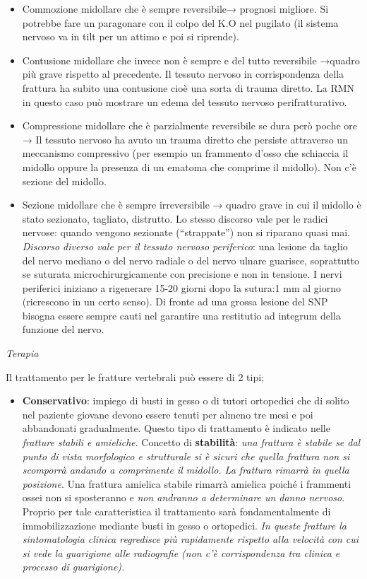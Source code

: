 \documentclass[]{article}
\begin{document}
\begin{itemize}
\item
  Commozione midollare che è sempre reversibile→ prognosi migliore. Si
  potrebbe fare un paragonare con il colpo del K.O nel pugilato (il
  sistema nervoso va in tilt per un attimo e poi si riprende).
\item
  Contusione midollare che invece non è sempre e del tutto reversibile
  →quadro più grave rispetto al precedente. Il tessuto nervoso in
  corrispondenza della frattura ha subito una contusione cioè una sorta
  di trauma diretto. La RMN in questo caso può mostrare un edema del
  tessuto nervoso perifratturativo.
\item
  Compressione midollare che è parzialmente reversibile se dura però
  poche ore → Il tessuto nervoso ha avuto un trauma diretto che persiste
  attraverso un meccanismo compressivo (per esempio un frammento d'osso
  che schiaccia il midollo oppure la presenza di un ematoma che comprime
  il midollo). Non c'è sezione del midollo.
\item
  Sezione midollare che è sempre irreversibile → quadro grave in cui il
  midollo è stato sezionato, tagliato, distrutto. Lo stesso discorso
  vale per le radici nervose: quando vengono sezionate (``strappate'')
  non si riparano quasi mai. \emph{Discorso diverso vale per il tessuto
  nervoso periferico}: una lesione da taglio del nervo mediano o del
  nervo radiale o del nervo ulnare guarisce, soprattutto se suturata
  microchirurgicamente con precisione e non in tensione. I nervi
  periferici iniziano a rigenerare 15-20 giorni dopo la sutura:1 mm al
  giorno (ricrescono in un certo senso). Di fronte ad una grossa lesione
  del SNP bisogna essere sempre cauti nel garantire una restitutio ad
  integrum della funzione del nervo.
\end{itemize}

\emph{Terapia}

Il trattamento per le fratture vertebrali può essere di 2 tipi;

\begin{itemize}
\item
  \textbf{Conservativo}: impiego di busti in gesso o di tutori
  ortopedici che di solito nel paziente giovane devono essere tenuti per
  almeno tre mesi e poi abbandonati gradualmente. Questo tipo di
  trattamento è indicato nelle \emph{fratture stabili e amieliche}.
  Concetto di \textbf{stabilità}: \emph{una frattura è stabile se dal
  punto di vista morfologico e strutturale si è sicuri che quella
  frattura non si scomporrà andando a comprimente il midollo. La
  frattura rimarrà in quella posizione}. Una frattura amielica stabile
  rimarrà amielica poiché i frammenti ossei non si sposteranno e
  \emph{non andranno a determinare un danno nervoso}. Proprio per tale
  caratteristica il trattamento sarà fondamentalmente di
  immobilizzazione mediante busti in gesso o ortopedici. \emph{In queste
  fratture la sintomatologia clinica regredisce più rapidamente rispetto
  alla velocità con cui si vede la guarigione alle radiografie (non c'è
  corrispondenza tra clinica e processo di guarigione).}
\end{itemize}
\end{document}
